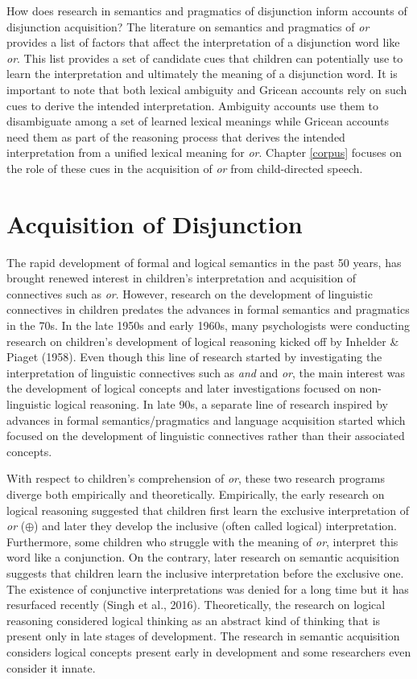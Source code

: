 \documentclass[oneside]{report}
\theoremstyle{definition}
\theoremstyle{definition}
\theoremstyle{definition}
\theoremstyle{remark}
\begin{document}
How does research in semantics and pragmatics of disjunction inform
accounts of disjunction acquisition? The literature on semantics and
pragmatics of \emph{or} provides a list of factors that affect the
interpretation of a disjunction word like \emph{or}. This list provides
a set of candidate cues that children can potentially use to learn the
interpretation and ultimately the meaning of a disjunction word. It is
important to note that both lexical ambiguity and Gricean accounts rely
on such cues to derive the intended interpretation. Ambiguity accounts
use them to disambiguate among a set of learned lexical meanings while
Gricean accounts need them as part of the reasoning process that derives
the intended interpretation from a unified lexical meaning for
\emph{or}. Chapter \ref{corpus} focuses on the role of these cues in the
acquisition of \emph{or} from child-directed speech.

\chapter{Acquisition of Disjunction}\label{devoLit}

The rapid development of formal and logical semantics in the past 50
years, has brought renewed interest in children's interpretation and
acquisition of connectives such as \emph{or}. However, research on the
development of linguistic connectives in children predates the advances
in formal semantics and pragmatics in the 70s. In the late 1950s and
early 1960s, many psychologists were conducting research on children's
development of logical reasoning kicked off by Inhelder \& Piaget
(1958). Even though this line of research started by investigating the
interpretation of linguistic connectives such as \emph{and} and
\emph{or}, the main interest was the development of logical concepts and
later investigations focused on non-linguistic logical reasoning. In
late 90s, a separate line of research inspired by advances in formal
semantics/pragmatics and language acquisition started which focused on
the development of linguistic connectives rather than their associated
concepts.

With respect to children's comprehension of \emph{or}, these two
research programs diverge both empirically and theoretically.
Empirically, the early research on logical reasoning suggested that
children first learn the exclusive interpretation of \emph{or}
(\(\oplus\)) and later they develop the inclusive (often called logical)
interpretation. Furthermore, some children who struggle with the meaning
of \emph{or}, interpret this word like a conjunction. On the contrary,
later research on semantic acquisition suggests that children learn the
inclusive interpretation before the exclusive one. The existence of
conjunctive interpretations was denied for a long time but it has
resurfaced recently (Singh et al., 2016). Theoretically, the research on
logical reasoning considered logical thinking as an abstract kind of
thinking that is present only in late stages of development. The
research in semantic acquisition considers logical concepts present
early in development and some researchers even consider it innate.
\end{document}
